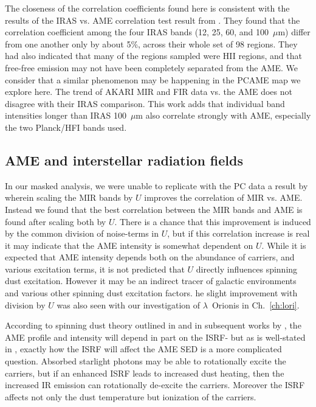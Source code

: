       The closeness of the correlation coefficients found here is consistent with the results of the IRAS vs. AME correlation test result from \cite{planckXV}. They found that the correlation coefficient among the four IRAS bands (12, 25, 60, and 100~$\mu$m) differ from one another only by about 5\%, across their whole set of 98 regions. They had also indicated that many of the regions sampled were HII regions, and that free-free emission may not have been completely separated from the AME. We consider that a similar phenomenon may be happening in the PCAME map we explore here. The trend of AKARI MIR and FIR data vs. the AME does not disagree with their IRAS comparison. This work adds that individual band intensities longer than IRAS 100~$\mu$m also correlate strongly with AME, especially the two Planck/HFI bands used.

          \subsection{AME and interstellar radiation fields}
            In our masked analysis, we were unable to replicate with the PC data a result by \cite{ysard10b} wherein scaling the MIR bands by $U$ improves the correlation of MIR vs. AME. Instead we found that the best correlation between the MIR bands and AME is found after scaling both by $U$. There is a chance that this improvement is induced by the common division of noise-terms in $U$, but if this correlation increase is real it may indicate that the AME intensity is somewhat dependent on $U$. While it is expected that AME intensity depends both on the abundance of carriers, and various excitation terms, it is not predicted that $U$ directly influences spinning dust excitation. However it may be an indirect tracer of galactic environments and various other spinning dust excitation factors. he slight improvement with division by $U$ was also seen with our investigation of $\lambda$~Orionis in Ch.~\ref{ch:lori}.

            According to spinning dust theory outlined in \cite{draine98a} and in subsequent works by \cite{ysard10a}, the AME profile and intensity will depend in part on the ISRF- but as is well-stated in \cite{hensley17a}, exactly how the ISRF will affect the AME SED is a more complicated question. Absorbed starlight photons may be able to rotationally excite the carriers, but if an enhanced ISRF leads to increased dust heating, then the increased IR emission can rotationally de-excite the carriers. Moreover the ISRF affects not only the dust temperature but ionization of the carriers.

